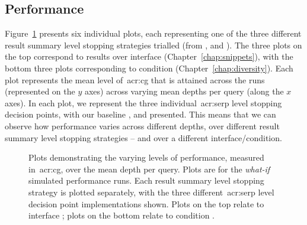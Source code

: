 \subsection{Performance}\label{sec:serp:results:perf}
Figure~\ref{fig:ch9_perf_plots} presents six individual plots, each representing one of the three different result summary level stopping strategies trialled (from ,  and ). The three plots on the top correspond to results over interface  (Chapter~\ref{chap:snippets}), with the bottom three plots corresponding to condition  (Chapter~\ref{chap:diversity}). Each plot represents the mean level of~\gls{acr:cg} that is attained across the runs (represented on the $y$ axes) across varying mean depths per query (along the $x$ axes). In each plot, we represent the three individual~\gls{acr:serp} level stopping decision points, with our baseline ,  and  presented. This means that we can observe how performance varies across different depths, over different result summary level stopping strategies -- and over a different interface/condition.

\begin{figure}[t!]
    \centering
    \caption[Stopping strategies and~\gls{acr:serp} decision point \emph{what-if} performance]{Plots demonstrating the varying levels of performance, measured in~\gls{acr:cg}, over the mean depth per query. Plots are for the \emph{what-if} simulated performance runs. Each result summary level stopping strategy is plotted separately, with the three different~\gls{acr:serp} level decision point implementations shown. Plots on the top relate to interface ; plots on the bottom relate to condition .}
    \label{fig:ch9_perf_plots}
\end{figure}


